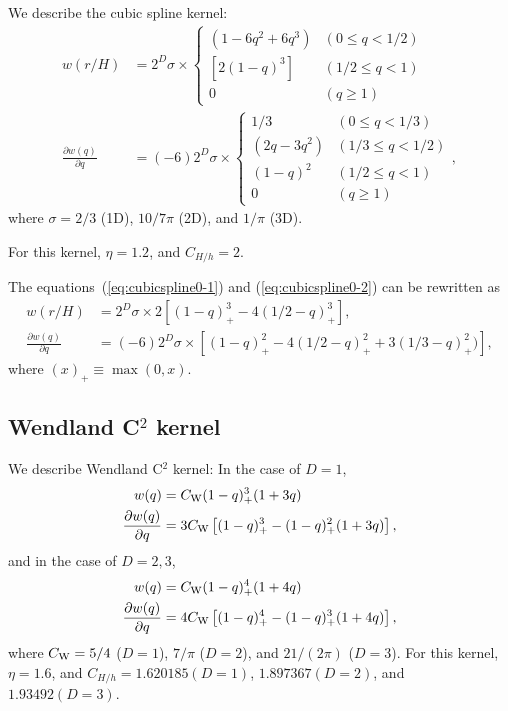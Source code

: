 \documentclass[fleqn,dvipdfmx]{article}
\begin{document}
We describe the cubic spline kernel:
\begin{align}
  w(r/H) &= 2^D \sigma \times \left\{
  \begin{array}{ll}
    \left( 1 - 6 q^2 + 6 q^3 \right) & (0 \le q < 1/2) \\
    \left[ 2 (1 - q)^3 \right] & (1/2 \le q < 1) \\
    0 & (q \ge 1)
  \end{array}
  \right. \label{eq:cubicspline0-1} \\
  \frac{\partial w(q)}{\partial q} &= (-6) 2^D \sigma
  \times \left\{
  \begin{array}{ll}
    1/3 & (0 \le q < 1/3) \\
    \left(2q - 3q^2 \right) & (1/3 \le q < 1/2) \\
    (1 - q)^2 & (1/2 \le q < 1) \\
    0 & (q \ge 1)
  \end{array}
  \right., \label{eq:cubicspline0-2}
\end{align}
where $\sigma = 2/3$ (1D), $10/7\pi$ (2D), and $1/\pi$ (3D).

For this kernel, $\eta=1.2$, and $C_{H/h}=2$.

The equations~(\ref{eq:cubicspline0-1}) and (\ref{eq:cubicspline0-2})
can be rewritten as
\begin{align}
  w(r/H) &= 2^D \sigma \times 2 \left[ (1-q)^3_+ - 4 (1/2 - q)^3_+
    \right], \\
  \frac{\partial w(q)}{\partial q} &= (-6)2^D \sigma \times \left[
    (1-q)^2_+ - 4(1/2-q)^2_+ + 3(1/3-q)^2_+) \right],
\end{align}
where $(x)_+ \equiv \max(0, x)$.

\subsection{Wendland C$^2$ kernel}

We describe Wendland C$^2$ kernel: In the case of $D = 1$,
\begin{align}
  w(q) &= C_{\rm W} (1-q)_+^3 (1+3q) \\ \frac{\partial w(q)}{\partial
    q} &= 3 C_{\rm W} \left[(1-q)^3_+ - (1-q)^2_+ (1+3q) \right],
\end{align}
and in the case of $D = 2, 3$,
\begin{align}
  w(q) &= C_{\rm W} (1-q)_+^4 (1+4q) \\ \frac{\partial w(q)}{\partial
    q} &= 4 C_{\rm W} \left[(1-q)^4_+ - (1-q)^3_+ (1+4q) \right],
\end{align}
where $C_{\rm W}=5/4$ ($D=1$), $7/\pi$ ($D=2$), and $21/(2\pi)$
($D=3$). For this kernel, $\eta=1.6$, and $C_{H/h}=1.620185(D=1)$,
$1.897367(D=2)$, and $1.93492(D=3)$.
\end{document}
